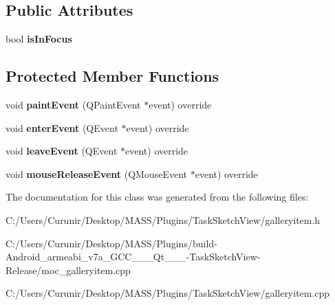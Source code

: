 \subsection*{Public Attributes}
\begin{DoxyCompactItemize}
\item 
\mbox{\label{class_gallery_item_a338ed1ece114426963316cb69b53babe}} 
bool {\bfseries is\+In\+Focus}
\end{DoxyCompactItemize}
\subsection*{Protected Member Functions}
\begin{DoxyCompactItemize}
\item 
\mbox{\label{class_gallery_item_a75d0afa0d561668b65a5f158efb7e7ce}} 
void {\bfseries paint\+Event} (Q\+Paint\+Event $\ast$event) override
\item 
\mbox{\label{class_gallery_item_a54f8de85efd7cde206458ce0ac5ad3a3}} 
void {\bfseries enter\+Event} (Q\+Event $\ast$event) override
\item 
\mbox{\label{class_gallery_item_afff165e5f0d9dcda2ce175cd44f58885}} 
void {\bfseries leave\+Event} (Q\+Event $\ast$event) override
\item 
\mbox{\label{class_gallery_item_a6565352fbaf2708e2483f12a499ef31f}} 
void {\bfseries mouse\+Release\+Event} (Q\+Mouse\+Event $\ast$event) override
\end{DoxyCompactItemize}


The documentation for this class was generated from the following files\+:\begin{DoxyCompactItemize}
\item 
C\+:/\+Users/\+Curunir/\+Desktop/\+M\+A\+S\+S/\+Plugins/\+Task\+Sketch\+View/galleryitem.\+h\item 
C\+:/\+Users/\+Curunir/\+Desktop/\+M\+A\+S\+S/\+Plugins/build-\/\+Android\+\_\+armeabi\+\_\+v7a\+\_\+\+G\+C\+C\+\_\+\_\+\_\+\+Qt\+\_\+\_\+\_-\/\+Task\+Sketch\+View-\/\+Release/moc\+\_\+galleryitem.\+cpp\item 
C\+:/\+Users/\+Curunir/\+Desktop/\+M\+A\+S\+S/\+Plugins/\+Task\+Sketch\+View/galleryitem.\+cpp\end{DoxyCompactItemize}
